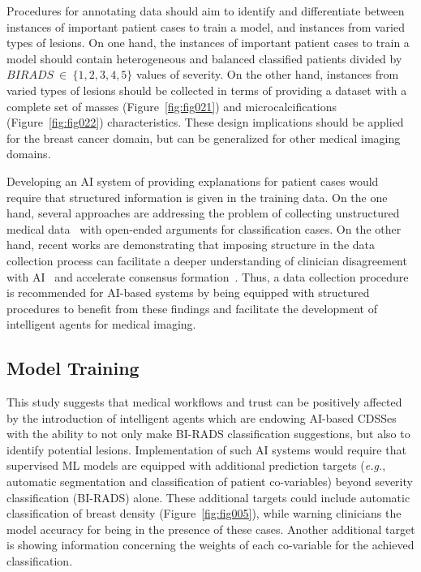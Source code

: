 Procedures for annotating data should aim to identify and differentiate between instances of important patient cases to train a model, and instances from varied types of lesions.
On one hand, the instances of important patient cases to train a model should contain heterogeneous and balanced classified patients divided by $BIRADS~\in~\{1, 2, 3, 4, 5\}$ values of severity.
On the other hand, instances from varied types of lesions should be collected in terms of providing a dataset with a complete set of masses (Figure~\ref{fig:fig021}) and microcalcifications (Figure~\ref{fig:fig022}) characteristics.
These design implications should be applied for the breast cancer domain, but can be generalized for other medical imaging domains.

Developing an \ac{AI} system of providing explanations for patient cases would require that structured information is given in the training data.
On the one hand, several approaches are addressing the problem of collecting unstructured medical data~\cite{10.1145/3308560.3317085, SchaekermannMike2020} with open-ended arguments for classification cases.
On the other hand, recent works are demonstrating that imposing structure in the data collection process can facilitate a deeper understanding of clinician disagreement with \ac{AI}~\cite{10.1145/3308560.3317085} and accelerate consensus formation~\cite{10.1145/3313831.3376506}.
Thus, a data collection procedure is recommended for \ac{AI}-based systems by being equipped with structured procedures to benefit from these findings and facilitate the development of intelligent agents for medical imaging.

\subsection{Model Training}
\label{sec:chap007004002}

This study suggests that medical workflows and trust can be positively affected by the introduction of intelligent agents which are endowing \ac{AI}-based \acp{CDSSe} with the ability to not only make \ac{BI-RADS} classification suggestions, but also to identify potential lesions.
Implementation of such \ac{AI} systems would require that supervised \ac{ML} models are equipped with additional prediction targets ({\it e.g.}, automatic segmentation and classification of patient co-variables) beyond severity classification (\ac{BI-RADS}) alone.
These additional targets could include automatic classification of breast density (Figure~\ref{fig:fig005}), while warning clinicians the model accuracy for being in the presence of these cases.
Another additional target is showing information concerning the weights of each co-variable for the achieved classification.

